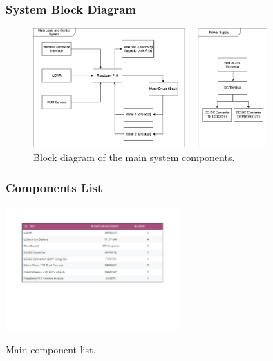 \documentclass{article}
\begin{document}
\subsubsection{System Block Diagram}
\begin{figure}[H]
    \centering
    \includegraphics[width=0.8\textwidth]{media/FYP-block-diagram.png} %
    \caption{Block diagram of the main system components.}
    \label{fig:block_diagram}
\end{figure}

\subsubsection{Components List}
\begin{table}[H]
    \centering
    \includegraphics[width=0.5\textwidth]{media/ProjectBudget - Arkusz3.pdf} %
    \caption{Main component list.}
    \label{table:component_list}
\end{table}
\end{document}
